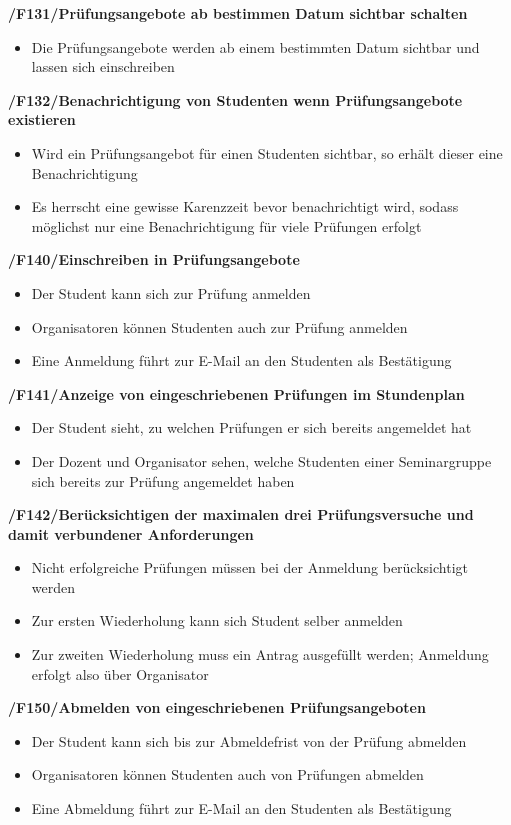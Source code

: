 \documentclass[12pt, a4paper]{scrartcl}
\newcommand{\ford}[2]{\textbf{/#1/\hspace{2em}#2}}
\begin{document}
\ford{F131}{Prüfungsangebote ab bestimmen Datum sichtbar schalten}
\begin{itemize}
	\item Die Prüfungsangebote werden ab einem bestimmten Datum sichtbar und lassen sich einschreiben
\end{itemize}

\ford{F132}{Benachrichtigung von Studenten wenn Prüfungsangebote existieren}
\begin{itemize}
	\item Wird ein Prüfungsangebot für einen Studenten sichtbar, so erhält dieser eine Benachrichtigung 
	\item Es herrscht eine gewisse Karenzzeit bevor benachrichtigt wird, sodass möglichst nur eine Benachrichtigung für viele Prüfungen erfolgt 
\end{itemize}

\ford{F140}{Einschreiben in Prüfungsangebote}
\begin{itemize}
	\item Der Student kann sich zur Prüfung anmelden
	\item Organisatoren können Studenten auch zur Prüfung anmelden
	\item Eine Anmeldung führt zur E-Mail an den Studenten als Bestätigung
\end{itemize}

\ford{F141}{Anzeige von eingeschriebenen Prüfungen im Stundenplan}
\begin{itemize}
	\item Der Student sieht, zu welchen Prüfungen er sich bereits angemeldet hat
	\item Der Dozent und Organisator sehen, welche Studenten einer Seminargruppe sich bereits zur Prüfung angemeldet haben
\end{itemize}

\ford{F142}{Berücksichtigen der maximalen drei Prüfungsversuche und damit verbundener Anforderungen}
\begin{itemize}
	\item Nicht erfolgreiche Prüfungen müssen bei der Anmeldung berücksichtigt werden
	\item Zur ersten Wiederholung kann sich Student selber anmelden
	\item Zur zweiten Wiederholung muss ein Antrag ausgefüllt werden; Anmeldung erfolgt also über Organisator 
\end{itemize}

\ford{F150}{Abmelden von eingeschriebenen Prüfungsangeboten}
\begin{itemize}
	\item Der Student kann sich bis zur Abmeldefrist von der Prüfung abmelden
	\item Organisatoren können Studenten auch von Prüfungen abmelden
	\item Eine Abmeldung führt zur E-Mail an den Studenten als Bestätigung
\end{itemize}
\end{document}
